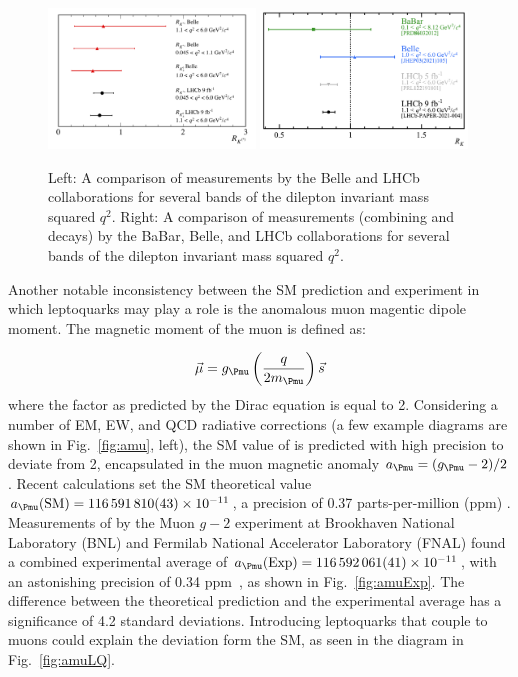 \begin{figure}[H]
    \centering
    {\includegraphics[width=0.49\textwidth]{Images/Theory/LHCbBelle.png}}
    {\includegraphics[width=0.49\textwidth]{Images/Theory/RKmeasurements.png}}
    \caption{Left: A comparison of \Ratio{\PKstar} measurements by the Belle and LHCb collaborations for several bands of the dilepton invariant mass squared $q^2$. Right: A comparison of \Ratio{\PK} measurements (combining \HepProcess{\PBplus \to \PKplus\Pleptonplus\Pleptonminus} and \HepProcess{\PBzero \to \PKzero\Pleptonplus\Pleptonminus} decays) by the BaBar, Belle, and LHCb collaborations for several bands of the dilepton invariant mass squared $q^2$.}
    \label{fig:FlavorAnomalies}
\end{figure}


Another notable inconsistency between the SM prediction and experiment in which leptoquarks may play a role is the anomalous muon magentic dipole moment. The magnetic moment of the muon is defined as:

\begin{equation}
    \vec{\mu} = \gmuon\left(\frac{q}{2m_{\Pmu}}\right)\vec{s}
\end{equation}
where the factor \gmuon as predicted by the Dirac equation is equal to 2. Considering a number of EM, EW, and QCD radiative corrections (a few example diagrams are shown in Fig.~\ref{fig:amu}, left), the SM value of \gmuon is predicted with high precision to deviate from 2, encapsulated in the muon magnetic anomaly $\amuon = (\gmuon-2)/2$. Recent calculations set the SM theoretical value $\amuon(\mathrm{SM})=\num{116591810(43)e-11}$, a precision of 0.37 parts-per-million (ppm) \cite{Aoyama2020}. Measurements of \amuon by the Muon $g-2$ experiment at Brookhaven National Laboratory (BNL) and Fermilab National Accelerator Laboratory (FNAL) found a combined experimental average of $\amuon(\mathrm{Exp}) = \num{116592061(41)e-11}$, with an astonishing precision of 0.34 ppm~\cite{Muongminus2}, as shown in Fig.~\ref{fig:amuExp}. The difference between the theoretical prediction and the experimental average has a significance of 4.2 standard deviations. Introducing leptoquarks that couple to muons could explain the deviation form the SM, as seen in the diagram in Fig.~\ref{fig:amuLQ}.

